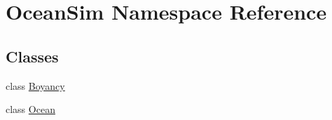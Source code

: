 \hypertarget{namespace_ocean_sim}{}\section{Ocean\+Sim Namespace Reference}
\label{namespace_ocean_sim}
\subsection*{Classes}
\begin{DoxyCompactItemize}
\item 
class \hyperlink{class_ocean_sim_1_1_boyancy}{Boyancy}
\item 
class \hyperlink{class_ocean_sim_1_1_ocean}{Ocean}
\end{DoxyCompactItemize}
